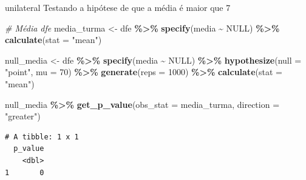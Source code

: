\documentclass[
  9pt,
  ignorenonframetext,
  aspectratio=169]{beamer}
\newenvironment{Shaded}{\begin{snugshade}}{\end{snugshade}}
\newcommand{\CommentTok}[1]{\textcolor[rgb]{0.56,0.35,0.01}{\textit{#1}}}
\newcommand{\DataTypeTok}[1]{\textcolor[rgb]{0.13,0.29,0.53}{#1}}
\newcommand{\DecValTok}[1]{\textcolor[rgb]{0.00,0.00,0.81}{#1}}
\newcommand{\KeywordTok}[1]{\textcolor[rgb]{0.13,0.29,0.53}{\textbf{#1}}}
\newcommand{\NormalTok}[1]{#1}
\newcommand{\OperatorTok}[1]{\textcolor[rgb]{0.81,0.36,0.00}{\textbf{#1}}}
\newcommand{\OtherTok}[1]{\textcolor[rgb]{0.56,0.35,0.01}{#1}}
\newcommand{\StringTok}[1]{\textcolor[rgb]{0.31,0.60,0.02}{#1}}
\begin{document}
\begin{frame}[fragile]{unilateral}
\protect\hypertarget{unilateral}{}
Testando a hipótese de que a média é maior que 7

\begin{Shaded}
\begin{Highlighting}[]
\CommentTok{\# Média dfe}
\NormalTok{media\_turma \textless{}{-}}\StringTok{ }\NormalTok{dfe }\OperatorTok{\%\textgreater{}\%}\StringTok{ }
\StringTok{  }\KeywordTok{specify}\NormalTok{(media }\OperatorTok{\textasciitilde{}}\StringTok{ }\OtherTok{NULL}\NormalTok{) }\OperatorTok{\%\textgreater{}\%}
\StringTok{  }\KeywordTok{calculate}\NormalTok{(}\DataTypeTok{stat =} \StringTok{"mean"}\NormalTok{)}

\NormalTok{null\_media \textless{}{-}}\StringTok{ }\NormalTok{dfe }\OperatorTok{\%\textgreater{}\%}\StringTok{ }
\StringTok{  }\KeywordTok{specify}\NormalTok{(media }\OperatorTok{\textasciitilde{}}\StringTok{ }\OtherTok{NULL}\NormalTok{) }\OperatorTok{\%\textgreater{}\%}
\StringTok{  }\KeywordTok{hypothesize}\NormalTok{(}\DataTypeTok{null =} \StringTok{"point"}\NormalTok{, }\DataTypeTok{mu =} \DecValTok{70}\NormalTok{) }\OperatorTok{\%\textgreater{}\%}
\StringTok{  }\KeywordTok{generate}\NormalTok{(}\DataTypeTok{reps =} \DecValTok{1000}\NormalTok{) }\OperatorTok{\%\textgreater{}\%}
\StringTok{  }\KeywordTok{calculate}\NormalTok{(}\DataTypeTok{stat =} \StringTok{"mean"}\NormalTok{)}

\NormalTok{null\_media }\OperatorTok{\%\textgreater{}\%}\StringTok{ }\KeywordTok{get\_p\_value}\NormalTok{(}\DataTypeTok{obs\_stat =}\NormalTok{ media\_turma, }\DataTypeTok{direction =} \StringTok{"greater"}\NormalTok{)}
\end{Highlighting}
\end{Shaded}

\begin{verbatim}
# A tibble: 1 x 1
  p_value
    <dbl>
1       0
\end{verbatim}
\end{frame}
\end{document}
